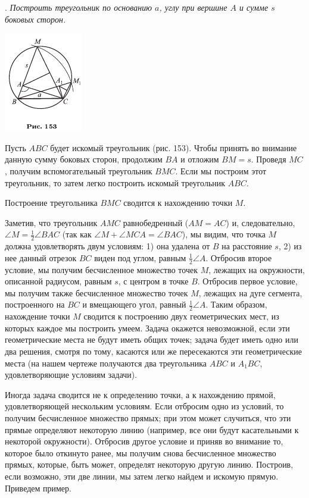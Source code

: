 \documentclass[oneside]{book}
\begin{document}
.
\emph{Построить треугольник по основанию $a$, углу при вершине $A$ и сумме $s$ боковых сторон.}

\includegraphics{pics/ris-153}

Пусть $ABC$ будет искомый треугольник (рис. 153).
Чтобы принять во внимание данную сумму боковых сторон, продолжим $BA$ и отложим $BM=s$.
Проведя $MC$, получим вспомогательный треугольник $BMC$.
Если мы построим этот треугольник, то затем легко построить искомый треугольник $ABC$.

Построение треугольника $BMC$ сводится к нахождению точки $M$.

Заметив, что треугольник $AMC$ равнобедренный ($AM=AC$) и, следовательно, $\angle M =  \tfrac12\angle BAC$ (так как $\angle M+\angle MCA = \angle BAC$), мы видим, что точка $M$ должна удовлетворять двум условиям:
1) она удалена от $B$ на расстояние $s$, 
2) из нее данный отрезок $BC$ виден под углом, равным $\tfrac12\angle A$.
Отбросив второе условие, мы получим бесчисленное множество точек $M$, лежащих на окружности, описанной радиусом, равным $s$, с центром в точке $B$.
Отбросив первое условие, мы получим также бесчисленное множество точек $M$, лежащих на дуге сегмента, построенного на $BC$ и вмещающего угол, равный $\tfrac12\angle A$.
Таким образом, нахождение точки $M$ сводится к построению двух геометрических мест, из которых каждое мы построить умеем.
Задача окажется невозможной, если эти геометрические места не будут иметь общих точек;
задача будет иметь одно или два решения, смотря по тому, касаются или же пересекаются эти геометрические места (на нашем чертеже получаются два треугольника $ABC$ и $A_1BC$, удовлетворяющие условиям задачи).

Иногда задача сводится не к определению точки, а к нахождению прямой, удовлетворяющей нескольким условиям.
Если отбросим одно из условий, то получим бесчисленное множество прямых;
при этом может случиться, что эти прямые определяют некоторую линию (например, все они будут касательными к некоторой окружности).
Отбросив другое условие и приняв во внимание то, которое было откинуто ранее, мы получим снова бесчисленное множество прямых, которые, быть может, определят некоторую другую линию.
Построив, если возможно, эти две линии, мы затем легко найдем и искомую прямую.
Приведем пример.
\end{document}
